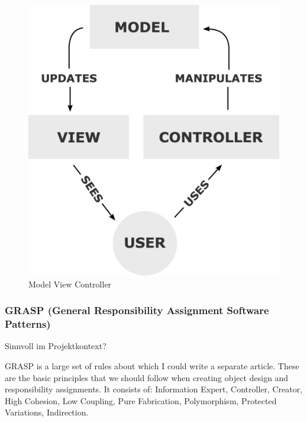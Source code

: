 \begin{figure}[h!]
    \centering
    \caption{Model View Controller}
    \label{fig:mvc}
    \includegraphics[scale=0.15]{assets/wikipedia_mvc_process}
\end{figure}

\subsubsection{GRASP (General Responsibility Assignment Software Patterns)}
\color{red}
Sinnvoll im Projektkontext?

GRASP is a large set of rules about which I could write a separate article.
These are the basic principles that we should follow when creating object design and responsibility assignments.
It consists of: Information Expert, Controller, Creator, High Cohesion, Low Coupling, Pure Fabrication, Polymorphism, Protected Variations, Indirection.
\color{black}
